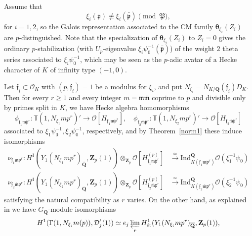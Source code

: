 \documentclass[10pt,letterpaper]{amsart}
\theoremstyle{plain}
\theoremstyle{definition}
\theoremstyle{definition}
\theoremstyle{plain}
\theoremstyle{plain}
\theoremstyle{plain}
\theoremstyle{remark}
\numberwithin{equation}{section}
\newcommand{\ch}{\xi}
\newcommand{\pp}{\mathfrak{p}}
\newcommand{\ppbar}{\bar{\mathfrak{p}}}
\newcommand{\fkm}{\mathfrak{m}}
\newcommand{\fkmbar}{\overline{\mathfrak{m}}}
\newcommand{\fkf}{\mathfrak{f}}
\DeclareMathOperator{\et}{\acute{e}t}
\def\cO{\mathcal O}
\newcommand{\Q}{\mathbf{Q}}
\newcommand{\Z}{\mathbf{Z}}
\begin{document}
Assume that 
\begin{equation}\label{eq:dist}
\xi_i(\pp)\not\equiv\xi_i(\ppbar)\pmod{\mathfrak{P}}, %
\tag{dist}
\end{equation}
for $i=1,2$, so the Galois representation associated to the CM family   $\boldsymbol{\theta}_{\xi_i}(Z_i)$ are $p$-distinguished. Note that the specialization of $\boldsymbol{\theta}_{\xi_i}(Z_i)$ to $Z_i=0$ gives the ordinary $p$-stabilization (with $U_p$-eigenvalue $\xi_i\psi_0^{-1}(\ppbar)$) of the weight $2$ theta series associated to $\xi_i\psi_0^{-1}$, which may be seen as the $p$-adic avatar of a Hecke character of $K$ of infinity type $(-1,0)$. 

Let $\fkf_i\subset\cO_K$ with $(p,\fkf_i)=1$ be a modulus for $\xi_i$, and put $N_{\xi_i}=N_{K/\Q}(\fkf_i)D_K$. Then for every $r\geq 1$ and every integer $m=\fkm\fkmbar$ coprime to $p$ and divisible only by primes split in $K$, we have Hecke algebra homomorphisms
\begin{equation}\label{eq:hecke-wild}
\phi_{\fkf_1\fkm\pp^r}:\mathbb{T}(1,N_{\xi_1}mp^r)'\rightarrow\cO[H_{\fkf_1\fkm\pp^r}],\quad
\phi_{\fkf_2\fkmbar\pp^r}:\mathbb{T}(1,N_{\xi_2}mp^r)'\rightarrow\cO[H_{\fkf_2\fkmbar\pp^r}]
\end{equation}
associated to $\ch_1\psi_0^{-1},\ch_2\psi_0^{-1}$, respectively, and by Theorem~\ref{norm1} these induce  isomorphisms
\begin{equation}\label{eq:iso-r}
\begin{aligned}
\nu_{\fkf_1\fkm\pp^r}:H^1_{\et}(Y_1(N_{\xi_1}mp^r)_{\overline{\Q}},\Z_p(1))\otimes_{\Z_p}\cO[H_{\fkf_1\fkm\pp^r}^{(p)}]&\xrightarrow{\simeq}{\mathrm{Ind}}_{K(\fkf_1\fkm\pp^r)}^\Q\cO(\ch_1^{-1}\psi_0)\\
\nu_{\fkf_2\fkmbar\pp^r}:H^1_{\et}(Y_1(N_{\xi_2}mp^r)_{\overline{\Q}},\Z_p(1))\otimes_{\Z_p}\cO[H_{\fkf_2\fkmbar\pp^r}^{(p)}]&\xrightarrow{\simeq}{\mathrm{Ind}}_{K(\fkf_2\fkmbar\pp^r)}^\Q\cO(\ch_2^{-1}\psi_0)
\end{aligned}
\nonumber
\end{equation}
satisfying the natural compatibility as $r$ varies. On the other hand, as %
explained in \cite[\S{5.6}]{ACR} 
we have $G_\Q$-module isomorphisms
\begin{equation}\label{eq:GS}
H^1(\Gamma(1,N_{\xi_i}m(p)),\mathcal{D}_{j}'(1))\simeq e_{j}\varprojlim_rH^1_{\et}(Y_1(N_{\xi_i}mp^r)_{\overline{\Q}},\Z_p(1)),
\end{equation}
\end{document}
